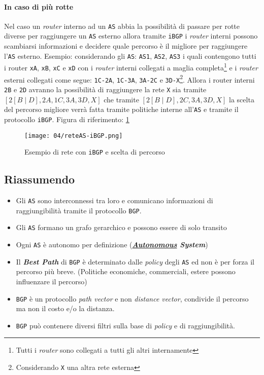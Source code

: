         \paragraph{In caso di più rotte} Nel caso un \textit{router} interno ad un \texttt{AS} abbia la possibilità di passare per rotte diverse per raggiungere un \texttt{AS} esterno allora tramite \texttt{iBGP} i \textit{router} interni possono scambiarsi informazioni e decidere quale percorso è il migliore per raggiungere l'\texttt{AS} esterno. Esempio: considerando gli \texttt{AS}: \texttt{AS1}, \texttt{AS2}, \texttt{AS3} i quali contengono tutti i router \texttt{xA}, \texttt{xB}, \texttt{xC} e \texttt{xD} con i \textit{router} interni collegati a maglia completa\footnote{Tutti i \textit{router} sono collegati a tutti gli altri internamente} e i \textit{router} esterni collegati come segue: \texttt{1C-2A}, \texttt{1C-3A}, \texttt{3A-2C} e \texttt{3D-X}\footnote{Considerando \texttt{X} una altra rete esterna}. Allora i router interni \texttt{2B} e \texttt{2D} avranno la possibilità di raggiungere la rete \texttt{X} sia tramite $[2[B\mid D],2A,1C,3A,3D,X]$ che tramite $[2[B\mid D],2C,3A,3D,X]$ la scelta del percorso migliore verrà fatta tramite politiche interne all'\texttt{AS} e tramite il protocollo \texttt{iBGP}.\newline
        Figura di riferimento: \ref{fig:reteAS-iBGP}
        \begin{figure}[H]
            \centering
            \texttt{[image: 04/reteAS-iBGP.png]}
            \caption{Esempio di rete con \texttt{iBGP} e scelta di percorso}
            \label{fig:reteAS-iBGP}
        \end{figure}
    \subsection*{Riassumendo}
        \begin{itemize}
            \item Gli \texttt{AS} sono interconnessi tra loro e comunicano informazioni di raggiungibilità tramite il protocollo \texttt{BGP}.
            \item Gli \texttt{AS} formano un grafo gerarchico e possono essere di solo transito
            \item Ogni \texttt{AS} è autonomo per definizione (\textit{\textbf{\underline{Autonomous}  System}})
            \item Il \textit{\textbf{Best Path}} di \texttt{BGP} è determinato dalle \textit{policy} degli \texttt{AS} ed non è per forza il percorso più breve. (Politiche economiche, commerciali, estere possono influenzare il percorso)
            \item \texttt{BGP} è un protocollo \textit{path vector} e non \textit{distance vector}, condivide il percorso ma non il costo e/o la distanza.
            \item \texttt{BGP} può contenere diversi filtri sulla base di \textit{policy} e di raggiungibilità.
        \end{itemize}